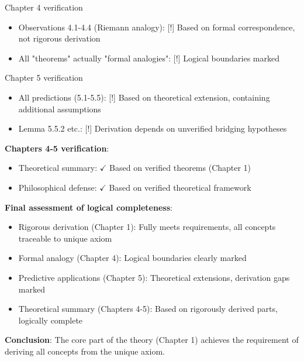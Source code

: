 Chapter 4 verification
\begin{itemize}
\item Observations 4.1-4.4 (Riemann analogy): [!] Based on formal correspondence, not rigorous derivation
\item All "theorems" actually "formal analogies": [!] Logical boundaries marked
\end{itemize}

Chapter 5 verification
\begin{itemize}
\item All predictions (5.1-5.5): [!] Based on theoretical extension, containing additional assumptions
\item Lemma 5.5.2 etc.: [!] Derivation depends on unverified bridging hypotheses
\end{itemize}

\textbf{Chapters 4-5 verification}:
\begin{itemize}
\item Theoretical summary: $\checkmark$ Based on verified theorems (Chapter 1)
\item Philosophical defense: $\checkmark$ Based on verified theoretical framework
\end{itemize}

\textbf{Final assessment of logical completeness}:
\begin{itemize}
\item Rigorous derivation (Chapter 1): Fully meets requirements, all concepts traceable to unique axiom
\item Formal analogy (Chapter 4): Logical boundaries clearly marked
\item Predictive applications (Chapter 5): Theoretical extensions, derivation gaps marked
\item Theoretical summary (Chapters 4-5): Based on rigorously derived parts, logically complete
\end{itemize}

\textbf{Conclusion}: The core part of the theory (Chapter 1) achieves the requirement of deriving all concepts from the unique axiom.

